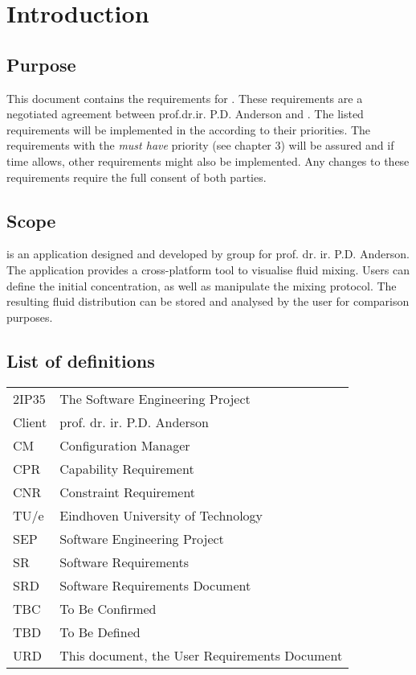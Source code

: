 \chapter{Introduction}

\section{Purpose}
This document contains the requirements for \projectname. These requirements are a negotiated agreement between prof.dr.ir. P.D. Anderson and \projectauthor. The listed requirements will be implemented in the \applicationname according to their priorities. The requirements with the \emph{must have} priority (see chapter 3) will be assured and if time allows, other requirements might also be implemented. Any changes to these requirements require the full consent of both parties.

\section{Scope}
\projectname is an application designed and developed by \projectauthor group for prof. dr. ir. P.D. Anderson. The application provides a cross-platform tool to visualise fluid mixing. Users can define the initial concentration, as well as manipulate the mixing protocol. The resulting fluid distribution can be stored and analysed by the user for comparison purposes. \\


\section{List of definitions}
\begin{tabular}{l|l}
2IP35 & The Software Engineering Project \\
Client & prof. dr. ir. P.D. Anderson \\
CM    &Configuration Manager \\
CPR & Capability Requirement \\
CNR & Constraint Requirement \\
TU/e  &Eindhoven University of Technology \\
SEP   &Software Engineering Project \\
SR    &Software Requirements \\
SRD   &Software Requirements Document \\
TBC & To Be Confirmed \\
TBD & To Be Defined \\
URD & This document, the User Requirements Document \\
\end{tabular}

